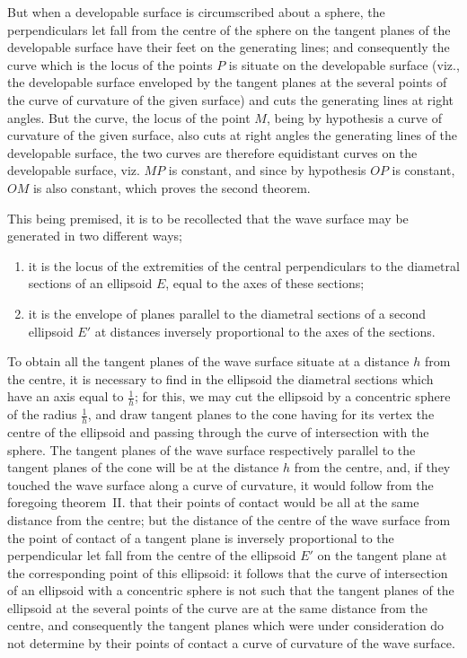 \documentclass[11pt,a4paper]{book}
\begin{document}
But when a developable surface is circumscribed about a sphere, the perpendiculars let fall from the centre of the sphere on the tangent planes of the developable surface have their feet on the generating lines; and consequently the curve which is the locus of the points $P$ is situate on the developable surface (viz., the developable surface enveloped by the tangent planes at the several points of the curve of curvature of the given surface) and cuts the generating lines at right angles. But the curve, the locus of the point $M$, being by hypothesis a curve of curvature of the given surface, also cuts at right angles the generating lines of the developable surface, the two curves are therefore equidistant curves on the developable surface, viz. $MP$ is constant, and since by hypothesis $OP$ is constant, $OM$ is also constant, which proves the second theorem.

This being premised, it is to be recollected that the wave surface may be generated in two different ways;
\begin{enumerate}
    \item[$1^\circ$] it is the locus of the extremities of the central perpendiculars to the diametral sections of an ellipsoid $E$, equal to the axes of these sections;
    \item[$2^\circ$] it is the envelope of planes parallel to the diametral sections of a second ellipsoid $E'$ at distances inversely proportional to the axes of the sections.
\end{enumerate}
To obtain all the tangent planes of the wave surface situate at a distance $h$ from the centre, it is necessary to find in the ellipsoid the diametral sections which have an axis equal to $\frac{1}{h}$; for this, we may cut the ellipsoid by a concentric sphere of the radius $\frac{1}{h}$, and draw tangent planes to the cone having for its vertex the centre of the ellipsoid and passing through the curve of intersection with the sphere. The tangent planes of the wave surface respectively parallel to the tangent planes of the cone will be at the distance $h$ from the centre, and, if they touched the wave surface along a curve of curvature, it would follow from the foregoing theorem~II. that their points of contact would be all at the same distance from the centre; but the distance of the centre of the wave surface from the point of contact of a tangent plane is inversely proportional to the perpendicular let fall from the centre of the ellipsoid $E'$ on the tangent plane at the corresponding point of this ellipsoid: it follows that the curve of intersection of an ellipsoid with a concentric sphere is not such that the tangent planes of the ellipsoid at the several points of the curve are at the same distance from the centre, and consequently the tangent planes which were under consideration do not determine by their points of contact a curve of curvature of the wave surface.
\end{document}
